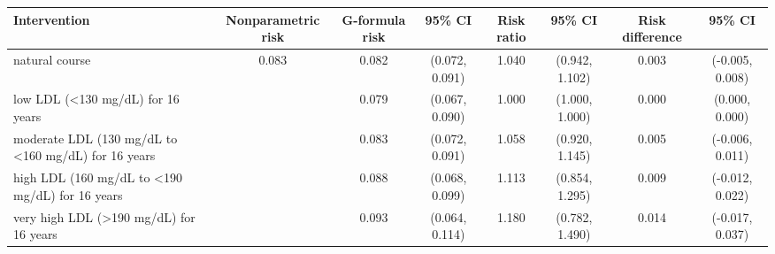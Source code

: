 
\begin{tabular}{lccccccc}
\toprule
Intervention & Nonparametric risk & G-formula risk & 95\% CI & Risk ratio & 95\% CI & Risk difference & 95\% CI\\
\midrule
natural course & 0.083 & 0.082 & (0.072, 0.091) & 1.040 & (0.942, 1.102) & 0.003 & (-0.005, 0.008)\\
low LDL (<130 mg/dL) for 16 years &  & 0.079 & (0.067, 0.090) & 1.000 & (1.000, 1.000) & 0.000 & (0.000, 0.000)\\
moderate LDL (130 mg/dL to <160 mg/dL) for 16 years &  & 0.083 & (0.072, 0.091) & 1.058 & (0.920, 1.145) & 0.005 & (-0.006, 0.011)\\
high LDL (160 mg/dL to <190 mg/dL) for 16 years &  & 0.088 & (0.068, 0.099) & 1.113 & (0.854, 1.295) & 0.009 & (-0.012, 0.022)\\
very high LDL (>190 mg/dL) for 16 years &  & 0.093 & (0.064, 0.114) & 1.180 & (0.782, 1.490) & 0.014 & (-0.017, 0.037)\\
\bottomrule
\end{tabular}
